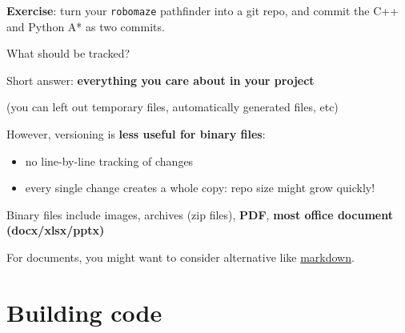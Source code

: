 \documentclass[compress]{beamer}
\begin{document}
\begin{frame}[plain]{}
    \begin{center}
        \Large
        {\bf Exercise}: turn your {\tt robomaze} pathfinder into a git repo, and commit the C++ and Python A* as two commits.
    \end{center}

\end{frame}

\begin{frame}{What should be tracked?}

    Short answer: \textbf{everything you care about in your project}
    \pause

    (you can left out temporary files, automatically generated files, etc)
    \pause

    However, versioning is \textbf{less useful for binary files}: 

    \begin{itemize}
        \item no line-by-line tracking of changes
        \item every single change creates a whole copy: repo size might grow
            quickly!
    \end{itemize}

    Binary files include images, archives (zip files), \textbf{PDF},
    \textbf{most office document (docx/xlsx/pptx)}
    \pause

    For documents, you might want to consider alternative like
    \href{https://en.wikipedia.org/wiki/Markdown\#Example}{markdown}.

\end{frame}


\section[Compilation]{Building code}
\end{document}
